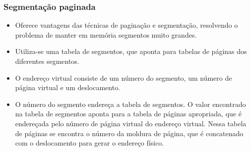 \documentclass[10pt]{article}
\begin{document}
\subsubsection{Segmentação paginada}
\begin{itemize}
    \item Oferece vantagens das técnicas de paginação e segmentação, resolvendo o problema
        de manter em memória segmentos muito grandes.
    \item Utiliza-se uma tabela de segmentos, que aponta para tabelas de páginas dos
        diferentes segmentos.
    \item O endereço virtual consiste de um número do segmento, um número de página virtual
        e um deslocamento.
    \item O número do segmento endereça a tabela de segmentos. O valor encontrado na tabela
        de segmentos aponta para a tabela de páginas apropriada, que é endereçada pelo
        número de página virtual do endereço virtual. Nessa tabela de páginas se encontra
        o número da moldura de página, que é concatenado com o deslocamento para gerar
        o endereço físico.
\end{itemize}
\end{document}
